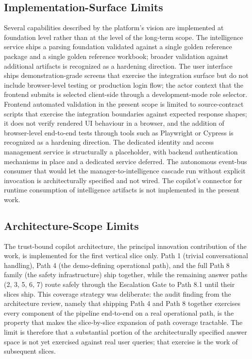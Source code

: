 \subsection*{Implementation-Surface Limits}
Several capabilities described by the platform's vision are implemented at foundation level rather than at the level of the long-term scope. The intelligence service ships a parsing foundation validated against a single golden reference package and a single golden reference workbook; broader validation against additional artifacts is recognized as a hardening direction. The user interface ships demonstration-grade screens that exercise the integration surface but do not include browser-level testing or production login flow; the actor context that the frontend submits is selected client-side through a development-mode role selector. Frontend automated validation in the present scope is limited to source-contract scripts that exercise the integration boundaries against expected response shapes; it does not verify rendered UI behaviour in a browser, and the addition of browser-level end-to-end tests through tools such as Playwright or Cypress is recognized as a hardening direction. The dedicated identity and access management service is structurally a placeholder, with backend authentication mechanisms in place and a dedicated service deferred. The autonomous event-bus consumer that would let the manager-to-intelligence cascade run without explicit invocation is architecturally specified and not wired. The copilot's connector for runtime consumption of intelligence artifacts is not implemented in the present work.

\subsection*{Architecture-Scope Limits}
The trust-bound copilot architecture, the principal innovation contribution of the work, is implemented for the first vertical slice only. Path 1 (trivial conversational handling), Path 4 (the demo-defining operational path), and the full Path 8 family (the safety infrastructure) ship together, while the remaining answer paths (2, 3, 5, 6, 7) route safely through the Escalation Gate to Path 8.1 until their slices ship. This coverage strategy was deliberate: the audit finding from the architecture review, namely that shipping Path 4 and Path 8 together exercises every component of the pipeline end-to-end on a real operational path, is the property that makes the slice-by-slice expansion of path coverage tractable. The limit is therefore that a substantial portion of the architecturally specified answer space is not yet exercised against real user queries; that exercise is the work of subsequent slices.

